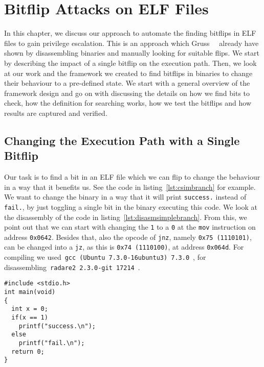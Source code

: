 \chapter{Bitflip Attacks on ELF Files}\label{sec:bitflip}

In this chapter, we discuss our approach to automate the finding bitflips in ELF
files to gain privilege escalation. This is an approach which
Gruss~\etal~\cite{flipinthewall} already have shown by disassembling binaries
and manually looking for suitable flips. We start by describing the impact of a
single bitflip on the execution path. Then, we look at our work and the
framework we created to find bitflips in binaries to change their behaviour to a
pre-defined state. We start with a general overview of the framework design and
go on with discussing the details on how we find bits to check, how the
definition for searching works, how we test the bitflips and how results are
captured and verified.

\section{Changing the Execution Path with a Single Bitflip}

Our task is to find a bit in an ELF file which we can flip to change the
behaviour in a way that it benefits us. See the code
in listing~\ref{lst:csimbranch} for example. We want to change the binary in a
way that it will print \texttt{success.} instead of \texttt{fail.}, by just
toggling a single bit in the binary executing this code. We look at the
disassembly of the code in listing~\ref{lst:disasmsimplebranch}. From this, we
point out that we can start with changing the \texttt{1} to a \texttt{0} at
the \texttt{mov} instruction on address \texttt{0x0642}. Besides that, also the
opcode of \texttt{jnz}, namely \texttt{0x75 (1110101)}, can be changed into a
\texttt{jz}, as this is \texttt{0x74 (1110100)}, at address \texttt{0x064d}. For
compiling we used~\texttt{gcc (Ubuntu 7.3.0-16ubuntu3) 7.3.0}~\cite{gccubuntu},
for disassembling~\texttt{radare2 2.3.0-git 17214}~\cite{radare2web}.

\begin{minipage}{\linewidth}
\begin{lstlisting}[style=CStyle,
                   caption={Simple branching code to show an example for a
single bitflip to change the execution path.},
                   label={lst:csimbranch}]
#include <stdio.h>
int main(void)
{
  int x = 0;
  if(x == 1)
    printf("success.\n");
  else
    printf("fail.\n");
  return 0;
}
\end{lstlisting}
\end{minipage}

